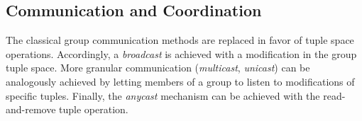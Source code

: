 %

\subsection{Communication and Coordination}\label{sec:group_cc}

 




The classical group communication methods are replaced in favor of tuple space operations. Accordingly, a \textit{broadcast} is achieved with a modification in the group tuple space. More granular communication (\textit{multicast}, \textit{unicast}) can be analogously achieved by letting members of a group to listen to modifications of specific tuples. Finally, the \textit{anycast} mechanism can be achieved with the read-and-remove tuple operation. 

